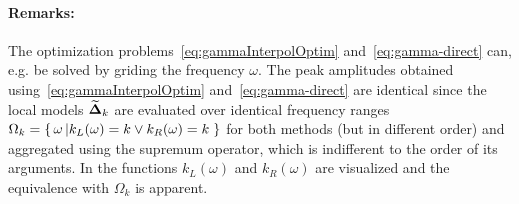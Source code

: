 \paragraph*{Remarks:}
The optimization problems~\eqref{eq:gammaInterpolOptim} and~\eqref{eq:gamma-direct} can, e.g. be solved by griding the frequency $\omega$.
The peak amplitudes obtained using~\eqref{eq:gammaInterpolOptim} and~\eqref{eq:gamma-direct} are identical since the local models $\widetilde{\mathbf{\Delta}}_k$ are evaluated over identical frequency ranges
$%
  \Omega_k = \set{\omega \given{k_L(\omega) = k \vee k_R(\omega) = k}}
$ %
for both methods (but in different order) and aggregated using the supremum operator, which is indifferent to the order of its arguments.
In  the functions $k_L(\omega)$ and $k_R(\omega)$ are visualized and the equivalence with $\Omega_k$ is apparent.

